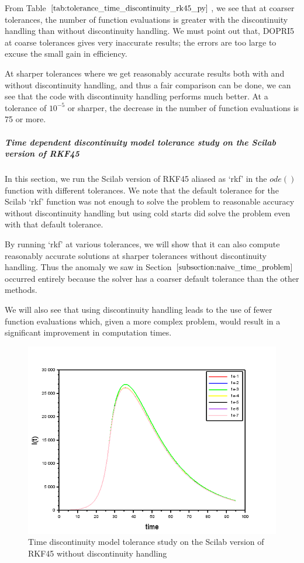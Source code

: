 From Table $\ref{tab:tolerance_time_discontinuity_rk45_py}$, we see that at coarser tolerances, the number of function evaluations is greater with the discontinuity handling than without discontinuity handling. We must point out that, DOPRI5 at coarse tolerances gives very inaccurate results; the errors are too large to excuse the small gain in efficiency.

At sharper tolerances where we get reasonably accurate results both with and without discontinuity handling, and thus a fair comparison can be done, we can see that the code with discontinuity handling performs much better. At a tolerance of $10^{-5}$ or sharper, the decrease in the number of function evaluations is 75 or more.

\subparagraph{Time dependent discontinuity model tolerance study on the Scilab version of RKF45}
In this section, we run the Scilab version of RKF45 aliased as `rkf' in the $ode()$ function with different tolerances. We note that the default tolerance for the Scilab `rkf' function was not enough to solve the problem to reasonable accuracy without discontinuity handling but using cold starts did solve the problem even with that default tolerance. 

By running `rkf' at various tolerances, we will show that it can also compute reasonably accurate solutions at sharper tolerances without discontinuity handling. Thus the anomaly we saw in Section $\ref{subsection:naive_time_problem}$ occurred entirely because the solver has a coarser default tolerance than the other methods.

We will also see that using discontinuity handling leads to the use of fewer function evaluations which, given a more complex problem, would result in a significant improvement in computation times.

\begin{figure}[H]
\centering
\includegraphics[width=0.7\linewidth]{./figures/tolerance_time_rk45_no_event_sci}
\caption{Time discontinuity model tolerance study on the Scilab version of RKF45 without discontinuity handling}
\label{fig:tolerance_time_rk45_no_event_sci}
\end{figure}

